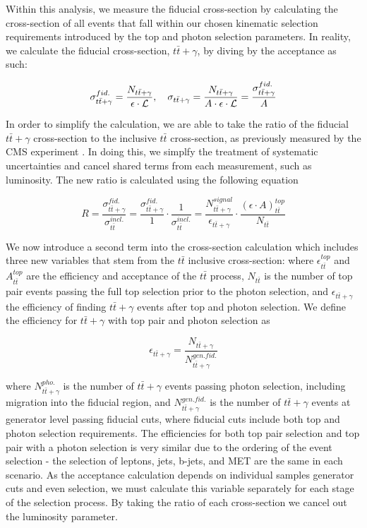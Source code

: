 Within this analysis, we measure the fiducial cross-section by calculating the cross-section of all events that fall within our chosen kinematic selection requirements introduced by the top and photon selection parameters. In reality, we calculate the fiducial cross-section, $t\bar{t}+\gamma$, by diving by the acceptance as such:

\begin{equation}
\sigma_{t\bar{t}+\gamma}^{fid.} = \frac{N_{t\bar{t}+\gamma}}{\epsilon \cdot \mathcal{L}}, \quad \sigma_{t\bar{t}+\gamma} = \frac{N_{t\bar{t}+\gamma}}{A \cdot \epsilon \cdot \mathcal{L}} = \frac{\sigma_{t\bar{t}+\gamma}^{fid.}}{A}
\end{equation}

In order to simplify the calculation, we are able to take the ratio of the fiducial $t\bar{t}+\gamma$ cross-section to the inclusive $t\bar{t}$ cross-section, as previously measured by the CMS experiment \cite{ttbarXsectiondilepton}. In doing this, we simplfy the treatment of systematic uncertainties and cancel shared terms from each measurement, such as luminosity. The new ratio is calculated using the following equation

\begin{equation}
R = \frac{\sigma_{t\bar{t}+\gamma}^{fid.}}{\sigma_{t\bar{t}}^{incl.}} = \frac{\sigma_{t\bar{t}+\gamma}^{fid.}}{1}\cdot\frac{1}{\sigma_{t\bar{t}}^{incl.}} = \frac{N_{t\bar{t}+\gamma}^{signal}}{\epsilon_{t\bar{t}+\gamma}} \cdot \frac{(\epsilon \cdot A)_{t\bar{t}}^{top}}{N_{t\bar{t}}}
\end{equation}

We now introduce a second term into the cross-section calculation which includes three new variables that stem from the $t\bar{t}$ inclusive cross-section: where $\epsilon_{t\bar{t}}^{top}$ and $A_{t\bar{t}}^{top}$ are the efficiency and acceptance of the $t\bar{t}$ process, $N_{t\bar{t}}$ is the number of top pair events passing the full top selection prior to the photon selection, and $\epsilon_{t\bar{t}+\gamma}$ the efficiency of finding $t\bar{t}+\gamma$ events after top and photon selection. We define the efficiency for $t\bar{t}+\gamma$ with top pair and photon selection as

\begin{equation}
\epsilon_{t\bar{t}+\gamma} = \frac{N_{t\bar{t}+\gamma}}{N_{t\bar{t}+\gamma}^{gen. fid.}}
\end{equation}


where $N_{t\bar{t}+\gamma}^{pho.}$ is the number of $t\bar{t}+\gamma$ events passing photon selection, including migration into the fiducial region, and $N_{t\bar{t}+\gamma}^{gen. fid.}$ is the number of $t\bar{t}+\gamma$ events at generator level passing fiducial cuts, where fiducial cuts include both top and photon selection requirements. The efficiencies for both top pair selection and top pair with a photon selection is very similar due to the ordering of the event selection - the selection of leptons, jets, b-jets, and MET are the same in each scenario. As the acceptance calculation depends on individual samples generator cuts and even selection, we must calculate this variable separately for each stage of the selection process. By taking the ratio of each cross-section we cancel out the luminosity parameter.

